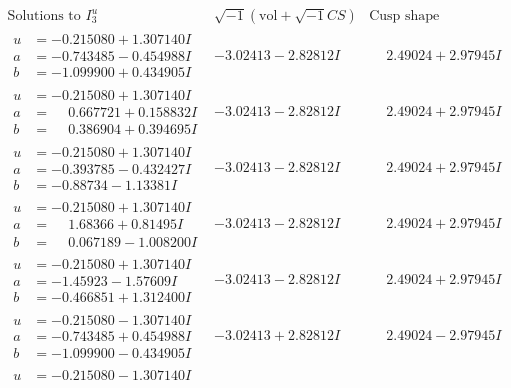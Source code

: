 \documentclass[1p]{elsarticle_modified}
\theoremstyle{definition}
\newcommand{\I}{\sqrt{-1}}
\begin{document}
$$\begin{array}{c|c|c}  
\text{Solutions to }I^u_{3}& \I (\text{vol} + \sqrt{-1}CS) & \text{Cusp shape}\\
 \hline 
\begin{aligned}
u &= -0.215080 + 1.307140 I \\
a &= -0.743485 - 0.454988 I \\
b &= -1.099900 + 0.434905 I\end{aligned}
 & -3.02413 - 2.82812 I & \phantom{-}2.49024 + 2.97945 I \\ \hline\begin{aligned}
u &= -0.215080 + 1.307140 I \\
a &= \phantom{-}0.667721 + 0.158832 I \\
b &= \phantom{-}0.386904 + 0.394695 I\end{aligned}
 & -3.02413 - 2.82812 I & \phantom{-}2.49024 + 2.97945 I \\ \hline\begin{aligned}
u &= -0.215080 + 1.307140 I \\
a &= -0.393785 - 0.432427 I \\
b &= -0.88734 - 1.13381 I\end{aligned}
 & -3.02413 - 2.82812 I & \phantom{-}2.49024 + 2.97945 I \\ \hline\begin{aligned}
u &= -0.215080 + 1.307140 I \\
a &= \phantom{-}1.68366 + 0.81495 I \\
b &= \phantom{-}0.067189 - 1.008200 I\end{aligned}
 & -3.02413 - 2.82812 I & \phantom{-}2.49024 + 2.97945 I \\ \hline\begin{aligned}
u &= -0.215080 + 1.307140 I \\
a &= -1.45923 - 1.57609 I \\
b &= -0.466851 + 1.312400 I\end{aligned}
 & -3.02413 - 2.82812 I & \phantom{-}2.49024 + 2.97945 I \\ \hline\begin{aligned}
u &= -0.215080 - 1.307140 I \\
a &= -0.743485 + 0.454988 I \\
b &= -1.099900 - 0.434905 I\end{aligned}
 & -3.02413 + 2.82812 I & \phantom{-}2.49024 - 2.97945 I \\ \hline\begin{aligned}
u &= -0.215080 - 1.307140 I \\

\end{aligned}
\end{array}$$
\end{document}

